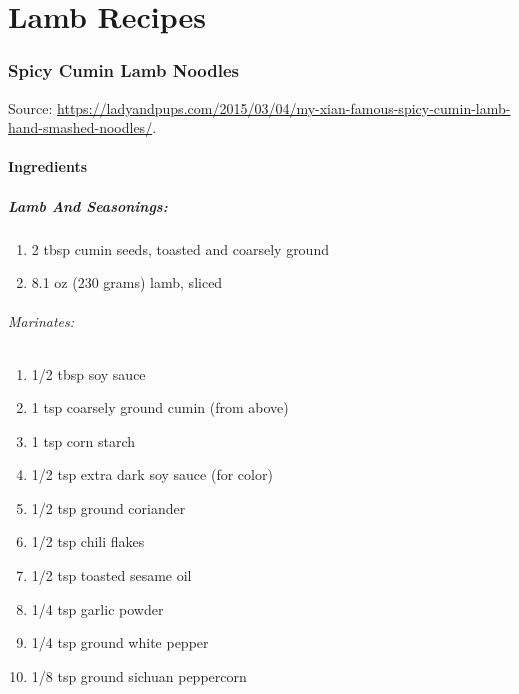 \documentclass[]{article}
\providecommand{\tightlist}{%
  \setlength{\itemsep}{0pt}\setlength{\parskip}{0pt}}
\let\oldparagraph\paragraph
\renewcommand{\paragraph}[1]{\oldparagraph{#1}\mbox{}}
\begin{document}
\hypertarget{part-lamb-recipes}{%
\part{Lamb Recipes}\label{part-lamb-recipes}}

\hypertarget{spicy-cumin-lamb-noodles}{%
\section{Spicy Cumin Lamb Noodles}\label{spicy-cumin-lamb-noodles}}

Source: \url{https://ladyandpups.com/2015/03/04/my-xian-famous-spicy-cumin-lamb-hand-smashed-noodles/}.

\hypertarget{ingredients}{%
\subsection{Ingredients}\label{ingredients}}

\hypertarget{lamb-and-seasonings}{%
\subsubsection{Lamb And Seasonings:}\label{lamb-and-seasonings}}

\begin{enumerate}
\def\labelenumi{\arabic{enumi}.}
\tightlist
\item
  2 tbsp cumin seeds, toasted and coarsely ground
\item
  8.1 oz (230 grams) lamb, sliced
\end{enumerate}

\hypertarget{marinates}{%
\paragraph{Marinates:}\label{marinates}}

\begin{enumerate}
\def\labelenumi{\arabic{enumi}.}
\tightlist
\item
  1/2 tbsp soy sauce
\item
  1 tsp coarsely ground cumin (from above)
\item
  1 tsp corn starch
\item
  1/2 tsp extra dark soy sauce (for color)
\item
  1/2 tsp ground coriander
\item
  1/2 tsp chili flakes
\item
  1/2 tsp toasted sesame oil
\item
  1/4 tsp garlic powder
\item
  1/4 tsp ground white pepper
\item
  1/8 tsp ground sichuan peppercorn
\end{enumerate}
\end{document}
